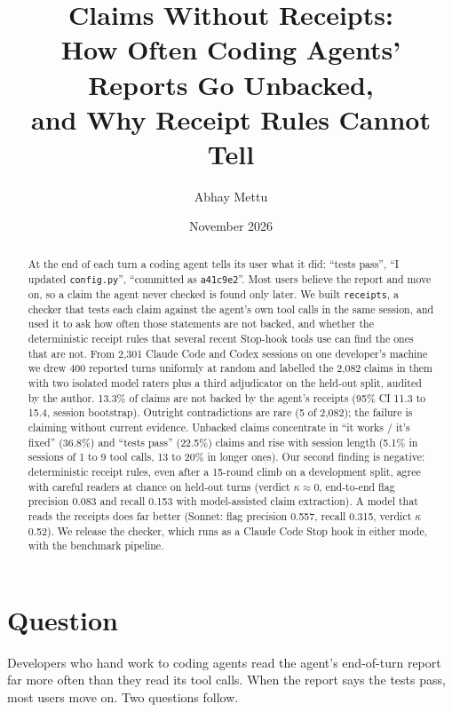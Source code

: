 \documentclass[11pt]{article}
\title{Claims Without Receipts:\\How Often Coding Agents' Reports Go Unbacked,\\and Why Receipt Rules Cannot Tell}
\author{Abhay Mettu}
\date{November 2026}
\begin{document}
\sloppy
\maketitle

\begin{abstract}
At the end of each turn a coding agent tells its user what it did: ``tests pass'', ``I updated
\texttt{config.py}'', ``committed as \texttt{a41c9e2}''. Most users believe the report and move on, so a claim
the agent never checked is found only later. We built \texttt{receipts}, a checker that tests each claim
against the agent's own tool calls in the same session, and used it to ask how often those statements are not
backed, and whether the deterministic receipt rules that several recent Stop-hook tools use can find the ones
that are not. From 2,301 Claude Code and Codex sessions on one
developer's machine we drew 400 reported turns uniformly at random and labelled the 2,082 claims in them with
two isolated model raters plus a third adjudicator on the held-out split, audited by the author. 13.3\% of
claims are not backed by the agent's receipts (95\% CI 11.3 to 15.4, session bootstrap). Outright contradictions
are rare (5 of 2,082); the failure is claiming without current evidence. Unbacked claims concentrate in ``it
works / it's fixed'' (36.8\%) and ``tests pass'' (22.5\%) claims and rise with session length (5.1\% in sessions
of 1 to 9 tool calls, 13 to 20\% in longer ones). Our second finding is negative: deterministic receipt rules,
even after a 15-round climb on a development split, agree with careful readers at chance on held-out turns
(verdict $\kappa \approx 0$, end-to-end flag precision 0.083 and recall 0.153 with model-assisted claim
extraction). A model that reads the receipts does far better (Sonnet: flag precision 0.557, recall 0.315,
verdict $\kappa$ 0.52). We release the checker, which runs as a Claude Code Stop hook in either mode, with the
benchmark pipeline.
\end{abstract}

\section{Question}

Developers who hand work to coding agents read the agent's end-of-turn report far more often than they read its
tool calls. When the report says the tests pass, most users move on. Two questions follow.
\end{document}
